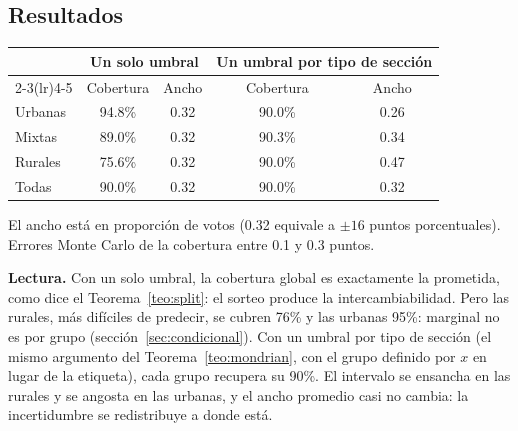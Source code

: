 \documentclass[11pt]{article}
\theoremstyle{plain}
\theoremstyle{definition}
\theoremstyle{remark}
\newcommand{\dest}[1]{\par\needspace{4\baselineskip}\textbf{#1}\quad}
\begin{document}
\subsection{Resultados}
\begin{center}
\begin{tabular}{lcccc}
\toprule
& \multicolumn{2}{c}{Un solo umbral} & \multicolumn{2}{c}{Un umbral por tipo de sección}\\
\cmidrule(lr){2-3}\cmidrule(lr){4-5}
& Cobertura & Ancho & Cobertura & Ancho\\
\midrule
Urbanas & 94.8\% & 0.32 & 90.0\% & 0.26\\
Mixtas & 89.0\% & 0.32 & 90.3\% & 0.34\\
Rurales & 75.6\% & 0.32 & 90.0\% & 0.47\\
\midrule
Todas & 90.0\% & 0.32 & 90.0\% & 0.32\\
\bottomrule
\end{tabular}
\end{center}
El ancho está en proporción de votos (0.32 equivale a $\pm16$ puntos porcentuales). Errores Monte
Carlo de la cobertura entre 0.1 y 0.3 puntos.

\dest{Lectura.} Con un solo umbral, la cobertura global es exactamente la prometida, como dice el
Teorema~\ref{teo:split}: el sorteo produce la intercambiabilidad. Pero las rurales, más difíciles de
predecir, se cubren 76\% y las urbanas 95\%: marginal no es por grupo (sección~\ref{sec:condicional}).
Con un umbral por tipo de sección (el mismo argumento del Teorema~\ref{teo:mondrian}, con el grupo
definido por $x$ en lugar de la etiqueta), cada grupo recupera su 90\%. El intervalo se ensancha en
las rurales y se angosta en las urbanas, y el ancho promedio casi no cambia: la incertidumbre se
redistribuye a donde está.
\end{document}
